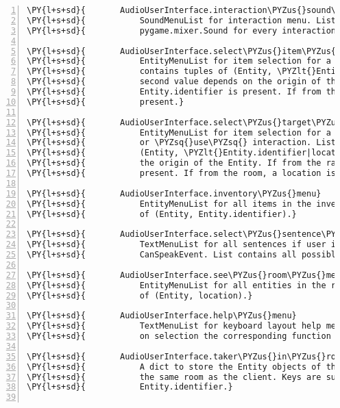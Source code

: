 \begin{Verbatim}[commandchars=\\\{\},numbers=left,firstnumber=1,stepnumber=1]
\PY{l+s+sd}{       AudioUserInterface.interaction\PYZus{}sound\PYZus{}menu}
\PY{l+s+sd}{           SoundMenuList for interaction menu. List contains a}
\PY{l+s+sd}{           pygame.mixer.Sound for every interaction.}

\PY{l+s+sd}{       AudioUserInterface.select\PYZus{}item\PYZus{}menu}
\PY{l+s+sd}{           EntityMenuList for item selection for a \PYZsq{}use\PYZsq{} interaction. List}
\PY{l+s+sd}{           contains tuples of (Entity, \PYZlt{}Entity.identifier|location\PYZgt{}). The}
\PY{l+s+sd}{           second value depends on the origin of the Entity. If from the rack,}
\PY{l+s+sd}{           Entity.identifier is present. If from the room, a location is}
\PY{l+s+sd}{           present.}

\PY{l+s+sd}{       AudioUserInterface.select\PYZus{}target\PYZus{}menu}
\PY{l+s+sd}{           EntityMenuList for item selection for a \PYZsq{}lockAt\PYZsq{}, \PYZsq{}pickUp\PYZsq{}, \PYZsq{}talkTo\PYZsq{}}
\PY{l+s+sd}{           or \PYZsq{}use\PYZsq{} interaction. List contains tuples of}
\PY{l+s+sd}{           (Entity, \PYZlt{}Entity.identifier|location\PYZgt{}). The second value depends on}
\PY{l+s+sd}{           the origin of the Entity. If from the rack, Entity.identifier is}
\PY{l+s+sd}{           present. If from the room, a location is present.}

\PY{l+s+sd}{       AudioUserInterface.inventory\PYZus{}menu}
\PY{l+s+sd}{           EntityMenuList for all items in the inventory. List contains tuples}
\PY{l+s+sd}{           of (Entity, Entity.identifier).}

\PY{l+s+sd}{       AudioUserInterface.select\PYZus{}sentence\PYZus{}menu}
\PY{l+s+sd}{           TextMenuList for all sentences if user interface has to process a}
\PY{l+s+sd}{           CanSpeakEvent. List contains all possible sentences.}

\PY{l+s+sd}{       AudioUserInterface.see\PYZus{}room\PYZus{}menu}
\PY{l+s+sd}{           EntityMenuList for all entities in the room. List contains tuples}
\PY{l+s+sd}{           of (Entity, location).}

\PY{l+s+sd}{       AudioUserInterface.help\PYZus{}menu}
\PY{l+s+sd}{           TextMenuList for keyboard layout help menu. List contains keys and}
\PY{l+s+sd}{           on selection the corresponding function is read out.}

\PY{l+s+sd}{       AudioUserInterface.taker\PYZus{}in\PYZus{}room\PYZus{}dict}
\PY{l+s+sd}{           A dict to store the Entity objects of the other players that are in}
\PY{l+s+sd}{           the same room as the client. Keys are supposed to be}
\PY{l+s+sd}{           Entity.identifier.}


\end{Verbatim}
